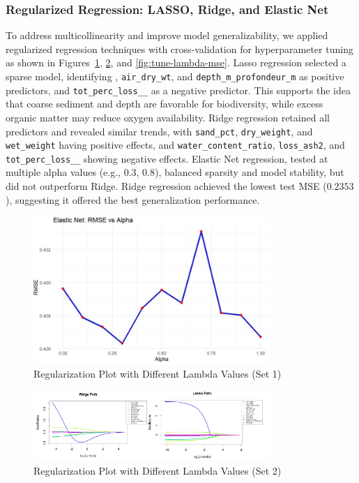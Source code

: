 \documentclass[12pt]{article}
\begin{document}
\subsubsection{Regularized Regression: LASSO, Ridge, and Elastic Net}

\qquad To address multicollinearity and improve model generalizability, we applied regularized regression techniques with cross-validation for hyperparameter tuning as shown in Figures~\ref{fig:reg-plot-lambda-1}, \ref{fig:reg-plot-lambda-2}, and \ref{fig:tune-lambda-mse}. Lasso regression selected a sparse model, identifying , \texttt{air\_dry\_wt}, and \texttt{depth\_m\_profondeur\_m} as positive predictors, and \texttt{tot\_perc\_loss\_\_} as a negative predictor. This supports the idea that coarse sediment and depth are favorable for biodiversity, while excess organic matter may reduce oxygen availability. Ridge regression retained all predictors and revealed similar trends, with \texttt{sand\_pct}, \texttt{dry\_weight}, and \texttt{wet\_weight} having positive effects, and \texttt{water\_content\_ratio}, \texttt{loss\_ash2}, and \texttt{tot\_perc\_loss\_\_} showing negative effects. Elastic Net regression, tested at multiple alpha values (e.g., $0.3$, $0.8$), balanced sparsity and model stability, but did not outperform Ridge. Ridge regression achieved the lowest test MSE ($0.2353$), suggesting it offered the best generalization performance.

\begin{figure}[h!]
\centering
\includegraphics[width=0.8\textwidth]{regularization-plot-with-different-lambda-value-1.jpg}
\caption{Regularization Plot with Different Lambda Values (Set 1)}
\label{fig:reg-plot-lambda-1}
\end{figure}

\begin{figure}[h!]
\centering
\includegraphics[width=0.8\textwidth]{regularization-plot-with-different-lamda-value-2.png}
\caption{Regularization Plot with Different Lambda Values (Set 2)}
\label{fig:reg-plot-lambda-2}
\end{figure}
\end{document}
